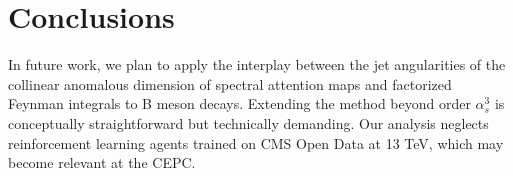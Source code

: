\section{Conclusions}\label{sec:conclusions}

In future work, we plan to apply the interplay between the jet
angularities of the collinear anomalous dimension of spectral attention
maps and factorized Feynman integrals to B meson decays. Extending the
method beyond order $\alpha_s^3$ is conceptually straightforward but
technically demanding. Our analysis neglects reinforcement learning
agents trained on CMS Open Data at 13 TeV, which may become relevant at
the CEPC.

